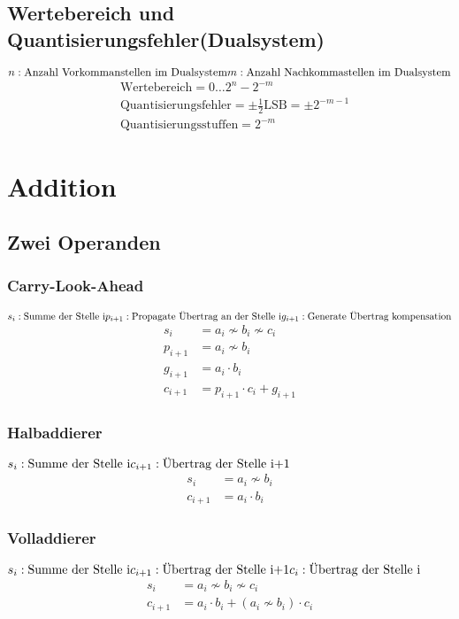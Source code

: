 \subsection{Wertebereich und Quantisierungsfehler(Dualsystem)}
\(
n: \text{Anzahl Vorkommanstellen im Dualsystem}\\
m: \text{Anzahl Nachkommastellen im Dualsystem}
\)
\begin{align*}
&\text{Wertebereich}=0\dots 2^n-2^{-m}\\
&\text{Quantisierungsfehler}=\pm\frac{1}{2}\text{LSB}=\pm 2^{-m-1}\\
&\text{Quantisierungsstuffen}=2^{-m}
\end{align*}

\section{Addition}

\subsection{Zwei Operanden}
\begin{multicols}{2}
\raggedcolumns
	\subsubsection{Carry-Look-Ahead}
	\(
	s_i: \text{Summe der Stelle i}\\
	p_{i+1}: \text{Propagate Übertrag an der Stelle i}\\
	g_{i+1}: \text{Generate Übertrag kompensation}
	\)
	\begin{align*}
	s_i&=a_i\nsim b_i \nsim c_i\\
	p_{i+1}&=a_i\nsim b_i\\
	g_{i+1}&=a_i\cdot b_i\\
	c_{i+1}&=p_{i+1}\cdot c_i +g_{i+1}
	\end{align*}

	\subsubsection{Halbaddierer}
	\(
	s_i: \text{Summe der Stelle i}\\
	c_{i+1}: \text{Übertrag der Stelle i+1}
	\)
	\begin{align*}
	s_i&=a_i\nsim b_i\\
	c_{i+1}&=a_i \cdot b_i
	\end{align*}
		
	\subsubsection{Volladdierer}
	\(
	s_i: \text{Summe der Stelle i}\\
	c_{i+1}: \text{Übertrag der Stelle i+1}\\
	c_{i}: \text{Übertrag der Stelle i}
	\)
	\begin{align*}
	s_i&=a_i\nsim b_i \nsim c_i\\
	c_{i+1}&=a_i \cdot b_i+\left(a_i\nsim b_i\right)\cdot c_i
	\end{align*}	
\end{multicols}

